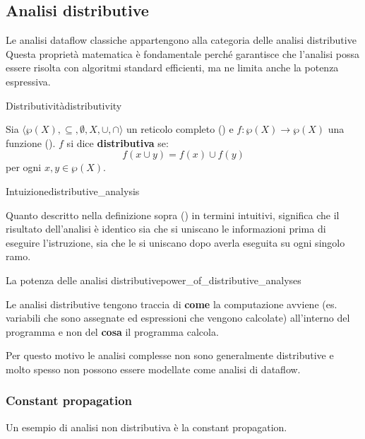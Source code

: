 \subsection{Analisi distributive}

Le analisi dataflow classiche appartengono alla categoria delle analisi
distributive
Questa proprietà matematica è fondamentale perché garantisce che l'analisi
possa essere risolta con algoritmi standard efficienti, ma ne limita anche la
potenza espressiva.

\begin{definizione}{Distributività}{distributivity}

Sia $\langle \wp(X), \subseteq, \emptyset, X, \cup, \cap \rangle$ un
reticolo completo () e $f: \wp(X) \to \wp(X)$
una funzione (). $f$ si dice \textbf{distributiva} se:
\[ f(x \cup y) = f(x) \cup f(y) \]
per ogni $x, y \in \wp(X)$.

\end{definizione}

\begin{nota}{Intuizione}{distributive_analysis}

Quanto descritto nella definizione sopra ()
in termini intuitivi, significa che il risultato dell'analisi è identico sia
che si uniscano le informazioni prima di eseguire l'istruzione, sia
che le si uniscano dopo averla eseguita su ogni singolo ramo.

\end{nota}

\begin{nota}{La potenza delle analisi distributive}{power_of_distributive_analyses}

Le analisi distributive tengono traccia di \textbf{come} la computazione avviene
(es. variabili che sono assegnate ed espressioni che vengono calcolate)
all'interno del programma e non del \textbf{cosa} il programma calcola.

Per questo motivo le analisi complesse non sono generalmente distributive e molto
spesso non possono essere modellate come analisi di dataflow.

\end{nota}

\subsubsection{Constant propagation}

Un esempio di analisi non distributiva è la constant propagation.

